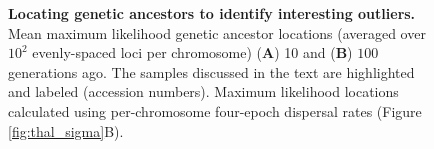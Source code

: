 \documentclass[12pt]{article}
\begin{document}
\begin{figure}[!htb]

\begin{center}


\end{center}

\caption{
\textbf{Locating genetic ancestors to identify interesting outliers.}
Mean maximum likelihood genetic ancestor locations (averaged over $10^2$ evenly-spaced loci per chromosome) (\textbf{A}) 10 and (\textbf{B}) $100$ generations ago.
The samples discussed in the text are highlighted and labeled (accession numbers).
Maximum likelihood locations calculated using per-chromosome four-epoch dispersal rates (Figure \ref{fig:thal_sigma}B).
}

\label{fig:thal_displaced}
\end{figure}
\end{document}

